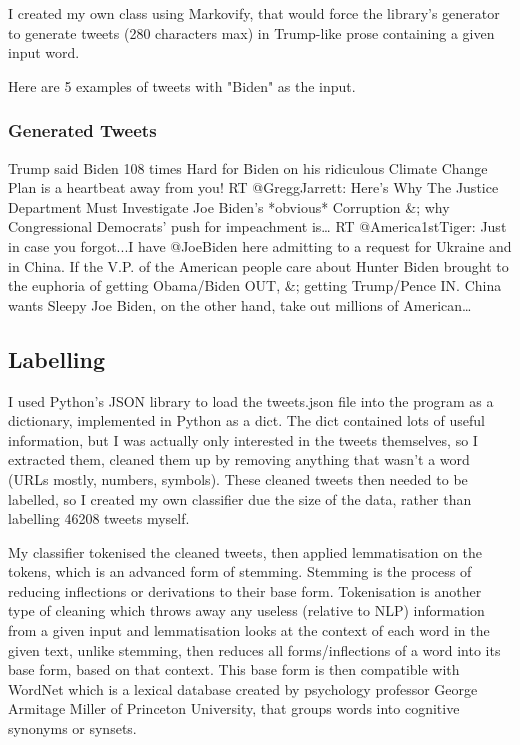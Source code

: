 \documentclass{article}
\begin{document}
I created my own class using Markovify, that would force the library's generator to generate tweets (280 characters max) in Trump-like prose containing a given input word.

Here are 5 examples of tweets with "Biden" as the input.

\subsubsection{Generated Tweets}
Trump said Biden 108 times
Hard for Biden on his ridiculous Climate Change Plan is a heartbeat away from you!
RT @GreggJarrett: Here’s Why The Justice Department Must Investigate Joe Biden’s *obvious* Corruption \&; why Congressional Democrats’ push for impeachment is…
RT @America1stTiger: Just in case you forgot...I have @JoeBiden here admitting to a request for Ukraine and in China.
If the V.P. of the American people care about Hunter Biden brought to the euphoria of getting Obama/Biden OUT, \&; getting Trump/Pence IN.
China wants Sleepy Joe Biden, on the other hand, take out millions of American…

\subsection{Labelling}

I used Python's JSON library to load the tweets.json file into the program as a dictionary, implemented in Python as a dict.
The dict contained lots of useful information, but I was actually only interested in the tweets themselves, so I extracted them, cleaned them up by removing anything that wasn't a word (URLs mostly, numbers, symbols).
These cleaned tweets then needed to be labelled, so I created my own classifier due the size of the data, rather than labelling 46208 tweets myself.

My classifier tokenised the cleaned tweets, then applied lemmatisation on the tokens, which is an advanced form of stemming.
Stemming is the process of reducing inflections or derivations to their base form.
Tokenisation is another type of cleaning which throws away any useless (relative to NLP) information from a given input and lemmatisation looks at the context of each word in the given text, unlike stemming, then reduces all forms/inflections of a word into its base form, based on that context.
This base form is then compatible with WordNet which is a lexical database created by psychology professor George Armitage Miller of Princeton University, that groups words into cognitive synonyms or synsets.
\end{document}
